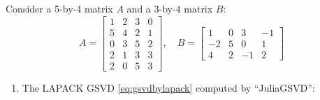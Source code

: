 \newpage
\begin{example} \label{eg:case1a} 
{\rm 
Consider a 5-by-4 matrix $A$ and a $3$-by-$4$ matrix $B$:
    \begin{equation*}
        A = \begin{bmatrix} 
            1 & 2 & 3 & 0\\
            5 & 4 & 2 & 1\\
            0 & 3 & 5 & 2\\
            2 & 1 & 3 & 3\\
            2 & 0 & 5 & 3
        \end{bmatrix}, \quad
        B = \begin{bmatrix}
            1 & 0 & 3 & -1 \\
            -2 & 5 & 0 & 1 \\
            4 & 2 & -1 & 2
        \end{bmatrix}
    \end{equation*}
\begin{enumerate}[(1).]

\item The LAPACK GSVD \eqref{eq:gsvdbylapack} computed by ``JuliaGSVD'': 
            

\end{enumerate}}
\end{example}
